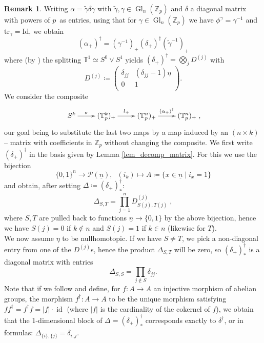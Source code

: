 \documentclass[10pt, a4paper, UKenglish]{article}
\numberwithin{equation}{section}
\newcommand{\cP}{\mathcal{P}}
\newcommand{\bZ}{\mathbb{Z}}
\newcommand{\sT}{\mathbb{T}}		%
\newcommand{\defas}{\coloneqq}  %
\newcommand{\abs}[1]{\left\vert#1\right\vert}	%
\newcommand{\with}{\mid}  %
\newcommand{\ind}[1]{\underline{#1}}
\newcommand{\tr}{\mathrm{tr}}
\newcommand{\id}{\operatorname{id}}
\newcommand{\Gl}{\operatorname{Gl}}
\newcommand{\Id}{\mathrm{Id}}
\theoremstyle{plain}
\theoremstyle{definition}
\newtheorem{rem}[equation]{Remark}
\renewcommand{\to}{\longrightarrow}
\begin{document}
\begin{rem}\label{rem_dagger_as_matrix}
Writing $\alpha = \tilde\gamma \delta \gamma$ with $\tilde\gamma,\gamma \in \Gl_n(\bZ_p)$ and $\delta$ a diagonal matrix with powers of $p\,$ as entries, using that for $\gamma \in \Gl_n(\bZ_p)$ we have $\phi^\gamma = \gamma^{-1}$ and $\tr_\gamma = \Id$, we obtain%
$$(\alpha_+)^\dagger = (\gamma^{-1})_+ (\delta_+)^\dagger (\tilde\gamma^{-1})_+$$
where (by \cite[Corollary 3.16]{carlsson2011higher}) the splitting $\sT^1 \simeq S^0 \vee S^1$ yields $(\delta_+)^\dagger = \bigotimes_j D^{(j)}$ with%
\begin{equation}\label{eq_diag_dagger}D^{(j)} \defas %
\left( \begin{array}{cc}
\delta_{jj} & (\delta_{jj} - 1) \eta \\
0 & 1 \\
\end{array} \right).\end{equation}
We consider the composite%
$$\begin{xy}
\xymatrix{
  S^k \ar[r]^-{\sigma} &%
  (\sT^k_p)_+ \ar[r]^-{l_+} &%
  (\sT^n_p)_+ \ar[r]^-{(\alpha_+)^\dagger} &%
  (\sT^n_p)_+%
  }%
\end{xy},$$
our goal being to substitute the last two maps by a map induced by an $(n \times k)$ -- matrix with coefficients in $\bZ_p$ without changing the composite. We first write $(\delta_+)^\dagger$ in the basis given by Lemma \ref{lem_decomp_matrix}. For this we use the bijection
$$\{0,1\}^n \to \cP(\ind{n}),\;\; (i_k) \longmapsto A \defas \{ x \in \ind{n} \with i_x = 1 \}$$%
and obtain, after setting $\Delta \defas (\delta_+)^\dagger_*$:
$$ \Delta_{S,T} = \prod_{j=1}^n D^{(j)}_{S(j),T(j)}\;,$$
where $S,T$ are pulled back to functions $\ind{n} \to \{0,1\}$ by the above bijection, hence we have $S(j) = 0$ if $k \notin \ind{n}$ and $S(j) = 1$ if $k \in \ind{n}$ (likewise for $T$).\\
We now assume $\eta$ to be nullhomotopic. If we have $S \neq T$, we pick a non-diagonal entry from one of the $D^{(j)}$s, hence the product $\Delta_{S,T}$ will be zero, so $(\delta_+)^\dagger_*$ is a diagonal matrix with entries
\begin{equation}\label{eq_dagger_of_diagnoal_plus}
	\Delta_{S,S} = \prod_{j \notin S} \delta_{jj}.
\end{equation}
Note that if we follow \cite[Def. 3.7]{carlsson2011higher} and define, for $f:A \to A$ an injective morphism of abelian groups, the morphism $f^\dagger: A \to A$ to be the unique morphism satisfying $f f^\dagger = f^\dagger f = \abs{f} \cdot \id$ (where $\abs{f}$ is the cardinality of the cokernel of $f$), we obtain that the 1-dimensional block of $\Delta = (\delta_+)^\dagger_*$ corresponds exactly to $\delta^\dagger$, or in formulas: $\Delta_{\{i\},\{j\}} = \delta_{i,j}$.\\

\end{rem}
\end{document}
